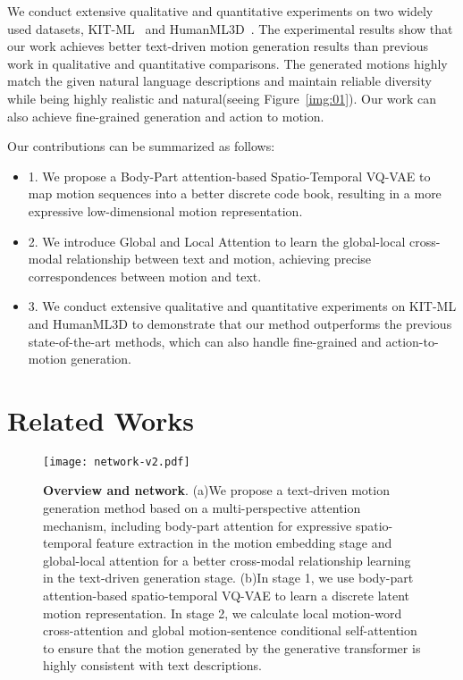 \documentclass[10pt,twocolumn,letterpaper]{article}
\begin{document}
We conduct extensive qualitative and quantitative experiments on two widely used datasets, KIT-ML~\cite{plappert2016kit} and HumanML3D~\cite{guo2022generating}. The experimental results show that our work achieves better text-driven motion generation results than previous work in qualitative and quantitative comparisons. The generated motions highly match the given natural language descriptions and maintain reliable diversity while being highly realistic and natural(seeing Figure~\ref{img:01}). Our work can also achieve fine-grained generation and action to motion.


Our contributions can be summarized as follows:
\vspace{-5pt}
\begin{itemize}
\item 1. We propose a Body-Part attention-based Spatio-Temporal VQ-VAE to map motion sequences into a better discrete code book, resulting in a more expressive low-dimensional motion representation.
\item 2. We introduce Global and Local Attention to learn the global-local cross-modal relationship between text and motion, achieving precise correspondences between motion and text.
\item 3. We conduct extensive qualitative and quantitative experiments on KIT-ML and HumanML3D to demonstrate that our method outperforms the previous state-of-the-art methods, which can also handle fine-grained and action-to-motion generation.
\end{itemize}




\section{Related Works}
\begin{figure*}[t]
    \centering
    \texttt{[image: network-v2.pdf]}
    \caption{\textbf{Overview and network}. (a)We propose a text-driven motion generation method based on a multi-perspective attention mechanism, including body-part attention for expressive spatio-temporal feature extraction in the motion embedding stage and global-local attention for a better cross-modal relationship learning in the text-driven generation stage. (b)In stage 1, we use body-part attention-based spatio-temporal VQ-VAE to learn a discrete latent motion representation. In stage 2, we calculate local motion-word cross-attention and global motion-sentence conditional self-attention to ensure that the motion generated by the generative transformer is highly consistent with text descriptions.}
    \label{img:02}
\end{figure*}
\end{document}
